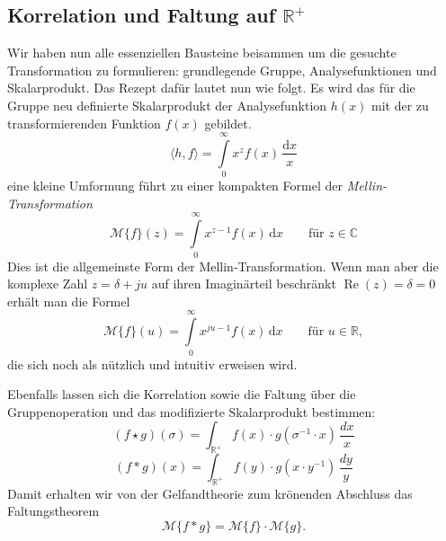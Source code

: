 \subsection{Korrelation und Faltung auf $\mathbb{R^+}$
\label{mellin:subsection:faltung}}
Wir haben nun alle essenziellen Bausteine beisammen um die gesuchte Transformation zu formulieren: grundlegende Gruppe, 
Analysefunktionen und Skalarprodukt.
Das Rezept dafür lautet nun wie folgt. Es wird das für die Gruppe neu definierte Skalarprodukt der Analysefunktion  $h(x)$
mit der zu transformierenden Funktion $f(x)$ gebildet.
\begin{equation}
    \langle h,f \rangle = \int\limits_{0}^{\infty} x^{z} f(x) \,\frac{\mathrm{d}x}{x}
\end{equation}
eine kleine Umformung führt zu einer kompakten Formel der \emph{Mellin-Transformation}
\begin{equation}
    \mathcal{M}\{f \}(z) = \int\limits_{0}^{\infty} x^{z-1} f(x) \,\mathrm{d}x  \qquad\text{für $z \in \mathbb{C}$}
    \label{mellin:mellin}
\end{equation}
Dies ist die allgemeinste Form der Mellin-Transformation. Wenn man aber die komplexe Zahl $z = \delta + ju$ auf ihren Imaginärteil beschränkt
$\operatorname{Re}(z) = \delta = 0$ erhält man die Formel
\begin{equation}
    \mathcal{M}\{f \}(u) = \int\limits_{0}^{\infty} x^{ju-1} f(x) \,\mathrm{d}x  \qquad\text{für $u \in \mathbb{R}$},
    \label{mellin:mellinu}
\end{equation}
die sich noch als nützlich und intuitiv erweisen wird.

Ebenfalls lassen sich die Korrelation sowie die Faltung über die Gruppenoperation und das modifizierte Skalarprodukt bestimmen:
\begin{equation}
    (f \star g)(\sigma ) = \int_\mathbb{R^+} f(x) \cdot g(\sigma ^{-1} \cdot x)\,\frac{dx}{x}
    \label{mellin:kreuzkorrelation*}
\end{equation}
\begin{equation}
    (f \ast g)(x) = \int_\mathbb{R^+} f(y) \cdot g(x \cdot y^{-1})\,\frac{dy}{y} 
\end{equation}
Damit erhalten wir von der Gelfandtheorie zum krönenden Abschluss das Faltungstheorem
\begin{equation}
    \mathcal{M}\{f \ast g\} = \mathcal{M}\{f\} \cdot \mathcal{M}\{g\}.
\end{equation}

